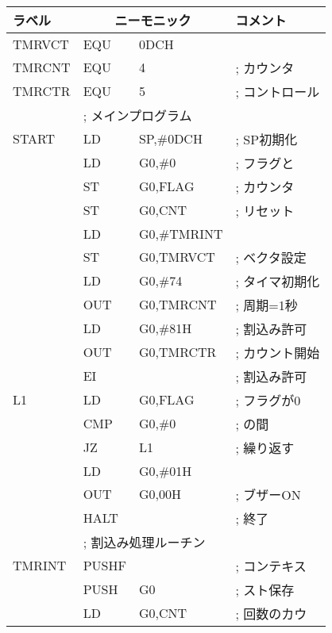 \begin{center}
{{\begin{center}
{\small\tt
\begin{tabular}{|l|l l l|} \hline
ラベル & \multicolumn{2}{|c}{ニーモニック} & コメント \\
\hline
TMRVCT & EQU    & 0DCH              &                 \\
TMRCNT & EQU    & 4                 & ; カウンタ      \\
TMRCTR & EQU    & 5                 & ; コントロール  \\
       & \multicolumn{3}{|l|}{; メインプログラム}     \\
START  & LD     & SP,\#0DCH         & ; SP初期化      \\
       & LD     & G0,\#0            & ; フラグと      \\
       & ST     & G0,FLAG           & ; カウンタ      \\
       & ST     & G0,CNT            & ; リセット      \\
       & LD     & G0,\#TMRINT       &                 \\
       & ST     & G0,TMRVCT         & ; ベクタ設定    \\
       & LD     & G0,\#74           & ; タイマ初期化  \\
       & OUT    & G0,TMRCNT         & ;   周期=1秒    \\
       & LD     & G0,\#81H          & ;   割込み許可  \\
       & OUT    & G0,TMRCTR	    & ;   カウント開始\\
       & EI     &                   & ; 割込み許可    \\
L1     & LD     & G0,FLAG           & ; フラグが0     \\
       & CMP    & G0,\#0            & ; の間          \\
       & JZ     & L1                & ; 繰り返す      \\
       & LD     & G0,\#01H          &                 \\
       & OUT    & G0,00H            & ; ブザーON      \\
       & HALT   &                   & ; 終了          \\
       & \multicolumn{3}{|l|}{; 割込み処理ルーチン}   \\
TMRINT & PUSHF  &                   & ; コンテキス    \\
       & PUSH   & G0                & ; スト保存      \\
       & LD     & G0,CNT            & ; 回数のカウ    \\

\end{tabular}}
\end{center}}}
\end{center}
